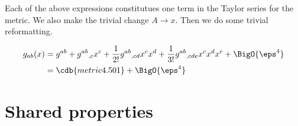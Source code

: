 \documentclass[12pt]{cdblatex}
\begin{document}
Each of the above expressions constitutues one term in the Taylor series for the metric.
We also make the trivial change $A\rightarrow x$. Then we do some trivial reformatting.

\begin{align*}
   g_{ab}(x) &=   g^{ab}
                + g^{ab}{}_{,c} x^c
                + \frac{1}{2!} g^{ab}{}_{,cd} x^c x^d
                + \frac{1}{3!} g^{ab}{}_{,cde} x^c x^d x^e +  \BigO{\eps^4}\\
             &= \cdb{metric4.501} + \BigO{\eps^4}
\end{align*}

\clearpage

\section*{Shared properties}
\end{document}

